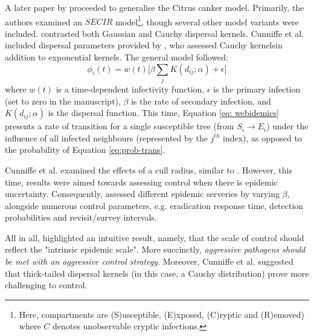 A later paper by \cite{WEBIDEMICS} proceeded to generalise the Citrus canker model.
Primarily, the authors examined an $SECIR$ model\footnote{
Here, compartments are (S)usceptible, (E)xposed, (C)ryptic and (R)emoved) where $C$ 
denotes unobservable cryptic infections.}, though several other model variants were included. 
\cite{WEBIDEMICS} contrasted both Gaussian and Cauchy dispersal kernels.
Cunniffe et al. included dispersal parameters provided by \cite{neri2014bayesian}, who
assessed Cauchy kernels\textemdash in addition to exponential kernels.
The general model followed:
\begin{equation}
\label{eq: webidemics}
     \phi_i(t) = w(t)\big[\beta \sum_j K(d_{ij}; \alpha) + \epsilon \big]
\end{equation}
where $w(t)$ is a time-dependent infectivity function, $\epsilon$ is the primary infection 
(set to zero in the manuscript), $\beta$ is the rate of secondary infection, and $K(d_{ij}; \alpha)$
is the dispersal function. This time, Equation \ref{eq: webidemics} presents a rate of transition for a single
susceptible tree (from $S_i \rightarrow E_i$) under the influence of all infected neighbours (represented by the $j^{th}$ index),
as opposed to the probability of Equation \ref{eq:prob-trans}.

Cunniffe et al. examined the effects of a cull radius, similar to \cite{parnell2010effect}. 
However, this time, results were aimed towards assessing control when there is epidemic uncertainty.
Consequently, \cite{WEBIDEMICS} assessed different epidemic serveries by varying $\beta$, alongside
numerous control parameters, e.g. eradication response time, detection probabilities and revisit/survey intervals. 

All in all, \cite{WEBIDEMICS} highlighted an intuitive result, namely, that the scale of control should
reflect the "intrinsic epidemic scale". More succinctly, \textit{aggressive pathogens should be met with 
an aggressive control strategy}. Moreover, Cunniffe et al. suggested that thick-tailed dispersal kernels
(in this case, a Cauchy distribution) prove more challenging to control.


